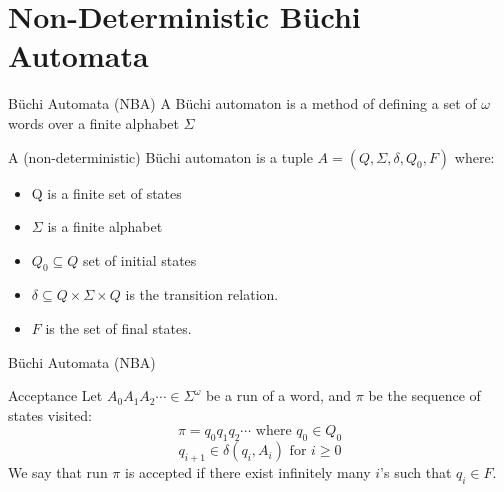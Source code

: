 \documentclass[14pts]{beamer}
\begin{document}
  \section{Non-Deterministic Büchi Automata}
  \begin{frame}{Büchi Automata (NBA)}
    A Büchi automaton is a method of defining a set of $\omega$ words over a finite alphabet $\Sigma$
    \begin{definition}
      A (non-deterministic) Büchi automaton is a tuple $A = (Q, \Sigma, \delta, Q_0, F)$ where:
      \begin{itemize}
        \item Q is a finite set of states
        \item $\Sigma$ is a finite alphabet
        \item $Q_0 \subseteq Q$ set of initial states
        \item $\delta \subseteq  Q \times \Sigma \times Q$ is the transition relation.
        \item $F$ is the set of final states.
      \end{itemize}
    \end{definition}
  \end{frame}
  \begin{frame}{Büchi Automata (NBA)}
    \begin{block}{Acceptance}
    Let $A_0A_1A_2\cdots\in\Sigma^{\omega}$ be a run of a word, and $\pi$ be the sequence of 
    states visited:
    \[\pi = q_0q_1q_2\cdots \text{ where } q_0 \in Q_0\]
    \[q_{i+1} \in \delta(q_i, A_i) \text{ for } i \geq 0\]
    We say that  run $\pi$ is accepted if there exist infinitely many $i$'s such that $q_i \in F$.
    \end{block}
  \end{frame}
\end{document}
